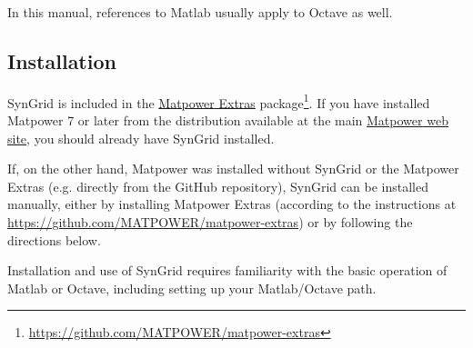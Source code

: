 \documentclass[12pt]{article}
\newcommand{\matlab}[0]{{\sc Matlab}}
\newcommand{\matpower}[0]{{\sc Matpower}}
\newcommand{\matpowerurl}[0]{https://matpower.org}
\newcommand{\matpowerextras}[0]{{\matpower{} Extras}}
\newcommand{\matpowerextrasurl}[0]{https://github.com/MATPOWER/matpower-extras}
\newcommand{\matpowerextraslink}[0]{\href{\matpowerextrasurl}{\matpowerextras{}}}
\newcommand{\syngrid}[0]{{SynGrid}}
\numberwithin{equation}{section}
\numberwithin{table}{section}
\numberwithin{figure}{section}
\begin{document}
In this manual, references to \matlab{} usually apply to Octave as well.

\subsection{Installation}
\label{sec:installation}

\syngrid{} is included in the \matpowerextraslink{} package\footnote{\url{\matpowerextrasurl}}. If you have installed \matpower{} 7 or later from the distribution available at the main \href{\matpowerurl}{\matpower{} web site}, you should already have \syngrid{} installed.

If, on the other hand, \matpower{} was installed without \syngrid{} or the  \matpowerextras{} (e.g. directly from the GitHub repository), \syngrid{} can be installed manually, either by installing \matpowerextras{} (according to the instructions at \url{\matpowerextrasurl}) or by following the directions below.

Installation and use of \syngrid{} requires familiarity with the basic operation of \matlab{} or Octave, including setting up your \matlab{}/Octave path.
\end{document}

